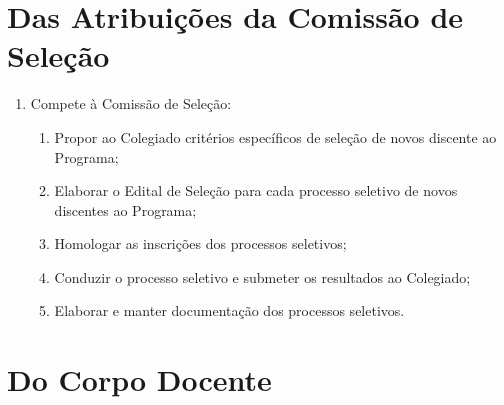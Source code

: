 \documentclass{article}
\begin{document}
\section{Das Atribuições da Comissão de Seleção}
\begin{enumerate}
	\item Compete à Comissão de Seleção:
	\begin{enumerate}[label=\Roman*]
		\item Propor ao Colegiado critérios específicos de seleção de novos discente ao Programa;
		\item Elaborar o Edital de Seleção para cada processo seletivo de novos discentes ao Programa;
		\item Homologar as inscrições dos processos seletivos;
		\item Conduzir o processo seletivo e submeter os resultados ao Colegiado;
		\item Elaborar e manter documentação dos processos seletivos.
	\end{enumerate}
\end{enumerate}

\section{Do Corpo Docente}
\end{document}
